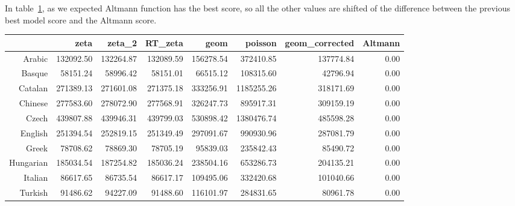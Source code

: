 \documentclass[paper=a4, fontsize=11pt]{scrartcl} %
\theoremstyle{plain}
\begin{document}
In table~\ref{diffAIC_A}, as we expected Altmann function has the best score, so all the other values are shifted of the difference between the previous best model score and the Altmann score.

\begin{table}[ht]
\centering
{} \label{diffAIC_A}
\begin{tabular}{rrrrrrrr}
  \hline
 & zeta & zeta\_2 & RT\_zeta & geom & poisson & geom\_corrected & Altmann \\ 
  \hline
Arabic & 132092.50 & 132264.87 & 132089.59 & 156278.54 & 372410.85 & 137774.84 & 0.00 \\ 
  Basque & 58151.24 & 58996.42 & 58151.01 & 66515.12 & 108315.60 & 42796.94 & 0.00 \\ 
  Catalan & 271389.13 & 271601.08 & 271375.18 & 333256.91 & 1185255.26 & 318171.69 & 0.00 \\ 
  Chinese & 277583.60 & 278072.90 & 277568.91 & 326247.73 & 895917.31 & 309159.19 & 0.00 \\ 
  Czech & 439807.88 & 439946.31 & 439799.03 & 530898.42 & 1380476.74 & 485598.28 & 0.00 \\ 
  English & 251394.54 & 252819.15 & 251349.49 & 297091.67 & 990930.96 & 287081.79 & 0.00 \\ 
  Greek & 78708.62 & 78869.30 & 78705.19 & 95839.03 & 235842.43 & 85490.72 & 0.00 \\ 
  Hungarian & 185034.54 & 187254.82 & 185036.24 & 238504.16 & 653286.73 & 204135.21 & 0.00 \\ 
  Italian & 86617.65 & 86735.54 & 86617.17 & 109495.06 & 332420.68 & 101040.66 & 0.00 \\ 
  Turkish & 91486.62 & 94227.09 & 91488.60 & 116101.97 & 284831.65 & 80961.78 & 0.00 \\ 
   \hline
\end{tabular}
\end{table}
\end{document}
